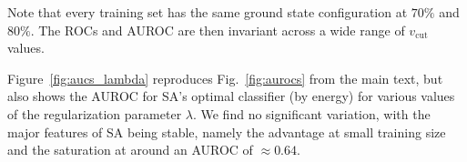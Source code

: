 Note that every training set has the same ground state configuration at $70\%$ and $80\%$. The ROCs and AUROC are  then invariant  across a wide range of $v_{\text{cut}}$ values.

Figure~\ref{fig:aucs_lambda} reproduces Fig.~\ref{fig:aurocs}
from the main text, but
also shows the AUROC for SA's optimal classifier (by energy) for various values of the regularization parameter $\lambda$. We find no significant variation, with the major features of SA being stable, namely the advantage at small training size and the saturation at around an AUROC of $\approx 0.64$.

\begin{figure}[h]
\centering
{}
\hfill
\vspace{-5cm}
\hfill
\vspace{-5cm}

\end{figure}
